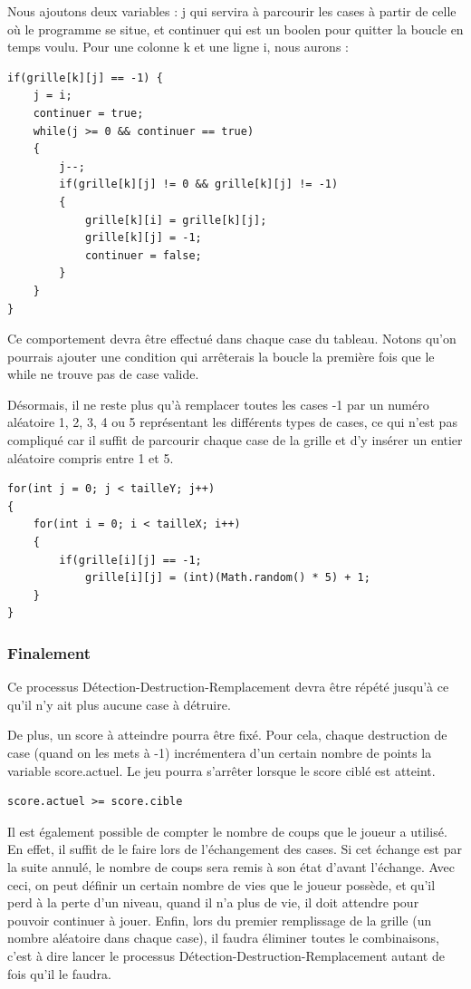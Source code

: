 	Nous ajoutons deux variables : j qui servira à parcourir les cases à partir de celle où le programme se situe, et continuer qui est un boolen pour quitter la boucle en temps voulu.
	Pour une colonne k et une ligne i, nous aurons :
\begin{lstlisting}
if(grille[k][j] == -1) {
	j = i;
	continuer = true;
	while(j >= 0 && continuer == true)
	{
		j--;
		if(grille[k][j] != 0 && grille[k][j] != -1)
		{
			grille[k][i] = grille[k][j];
			grille[k][j] = -1;
			continuer = false;
		}
	}
}
\end{lstlisting}

	Ce comportement devra être effectué dans chaque case du tableau. Notons qu'on pourrais ajouter une condition qui arrêterais la boucle la première fois que le while ne trouve pas de case valide.
	
	Désormais, il ne reste plus qu'à remplacer toutes les cases -1 par un numéro aléatoire 1, 2, 3, 4 ou 5 représentant les différents types de cases, ce qui n'est pas compliqué car 
il suffit de parcourir chaque case de la grille et d'y insérer un entier aléatoire compris entre 1 et 5.

\begin{lstlisting}
for(int j = 0; j < tailleY; j++)
{
	for(int i = 0; i < tailleX; i++)
	{
		if(grille[i][j] == -1;
			grille[i][j] = (int)(Math.random() * 5) + 1;
	}
}
\end{lstlisting}

\subsubsection{Finalement}

Ce processus Détection-Destruction-Remplacement devra être répété jusqu'à ce qu'il n'y ait plus aucune case à détruire.

De plus, un score à atteindre pourra être fixé. Pour cela, chaque destruction de case (quand on les mets à -1) incrémentera d'un certain nombre de points la variable score.actuel. Le jeu pourra s'arrêter lorsque le score ciblé est atteint.
\begin{lstlisting}
score.actuel >= score.cible
\end{lstlisting}

Il est également possible de compter le nombre de coups que le joueur a utilisé. En effet, il suffit de le faire lors de l'échangement des cases. Si cet échange est par la suite annulé, le nombre de coups sera remis à son état d'avant l'échange.
Avec ceci, on peut définir un certain nombre de vies que le joueur possède, et qu'il perd à la perte d'un niveau, quand il n'a plus de vie, il doit attendre pour pouvoir continuer à jouer.
Enfin, lors du premier remplissage de la grille (un nombre aléatoire dans chaque case), il faudra éliminer toutes le combinaisons, c'est à dire lancer le processus Détection-Destruction-Remplacement autant de fois qu'il le faudra.

